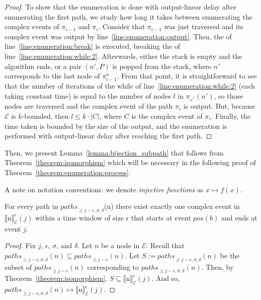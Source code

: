 \begin{proof}
  To show that the enumeration is done with output-linear delay after enumerating the first path, we study how long it takes between enumerating the complex events of $\pi_{i-1}$ and $\pi_{i}$. Consider that $\pi_{i-1}$ was just traversed and its complex event was output by line~\ref{line:enumeration:output}. Then, the  of line~\ref{line:enumeration:break} is executed, breaking the  of line~\ref{line:enumeration:while:2}. Afterwards, either the stack is empty and the algorithm ends, or a pair $(n', P)$ is popped from the stack, where $n'$ corresponds to the last node of $\pi^{u}_{i-1}$. From that point, it is straightforward to see that the number of iterations of the while of line~\ref{line:enumeration:while:2} (each taking constant time) is equal to the number of nodes $l$ in $\pi_{\swarrow}(n')$, so those nodes are traversed and the complex event of the path $\pi_{i}$ is output. But, because $\mathcal{E}$ is $k$-bounded, then $l \le k \cdot |C|$, where $C$ is the complex event of $\pi_{i}$. Finally, the time taken is bounded by the size of the output, and the enumeration is performed with output-linear delay after reaching the first path.
\end{proof}

Then, we present Lemma~\ref{lemma:bijection_subpath} that follows from Theorem~\ref{theorem:isomorphism} which will be necessary in the following proof of Theorem~\ref{theorem:enumeration:process}.

A note on notation conventions: we denote \emph{injective functions} as $x \mapsto f(x)$.

\begin{lemma}\label{lemma:bijection_subpath}
  For every path in ${paths}_{\ge j-\epsilon, \sigma, \delta}$(n) there exist exactly one complex event in ${\llbracket \text{n} \rrbracket}^{\epsilon}_{\mathcal{E}}(j)$ within a time window of size $\epsilon$ that starts at event $pos(b)$ and ends at event $j$.
\end{lemma}

\begin{proof}
  Fix $j$, $\epsilon$, $\sigma$, and $\delta$. Let $n$ be a node in $\mathcal{E}$. Recall that ${paths}_{\ge j-\epsilon, \sigma, \delta}(n) \subseteq {paths}_{\ge j-\epsilon}(n)$. Let $S := {paths}_{\ge j-\epsilon, \sigma, \delta}(n)$ be the subset of ${paths}_{\ge j-\epsilon}(n)$ corresponding to ${paths}_{\ge j-\epsilon, \sigma, \delta}(n)$. Then, by Theorem~\ref{theorem:isomorphism}, $S \subseteq {\llbracket \text{n} \rrbracket}^{\epsilon}_{\mathcal{E}}(j)$. And so, ${paths}_{\ge j-\epsilon, \sigma, \delta}(n) \mapsto {\llbracket \text{n} \rrbracket}^{\epsilon}_{\mathcal{E}}(j)$.
\end{proof}

